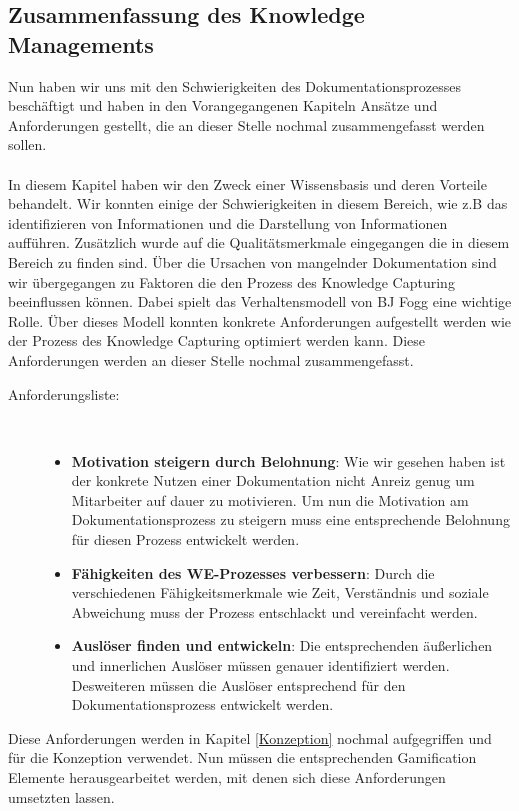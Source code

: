 \documentclass[a4paper,12pt]{scrartcl}
\begin{document}
\subsection{Zusammenfassung des Knowledge Managements}
\label{Zusammenfassung des Knowledge Managements}
Nun haben wir uns mit den Schwierigkeiten des Dokumentationsprozesses beschäftigt und haben in den Vorangegangenen Kapiteln Ansätze und Anforderungen gestellt, die an dieser Stelle nochmal zusammengefasst werden sollen.
\\\\
In diesem Kapitel haben wir den Zweck einer Wissensbasis und deren Vorteile behandelt. Wir konnten einige der Schwierigkeiten in diesem Bereich, wie z.B das identifizieren von Informationen und die Darstellung von Informationen aufführen. Zusätzlich wurde auf die Qualitätsmerkmale eingegangen die in diesem Bereich zu finden sind. Über die Ursachen von mangelnder Dokumentation sind wir übergegangen zu Faktoren die den Prozess des Knowledge Capturing beeinflussen können. Dabei spielt das Verhaltensmodell von BJ Fogg eine wichtige Rolle. Über dieses Modell konnten konkrete Anforderungen aufgestellt werden wie der Prozess des Knowledge Capturing optimiert werden kann. Diese Anforderungen werden an dieser Stelle nochmal zusammengefasst.
\begin{description}
   \item[Anforderungsliste:]~\par
   \begin{itemize}
      \item \textbf{Motivation steigern durch Belohnung}: Wie wir gesehen haben ist der konkrete Nutzen einer Dokumentation nicht Anreiz genug um Mitarbeiter auf dauer zu motivieren. Um nun die Motivation am Dokumentationsprozess zu steigern muss eine entsprechende Belohnung für diesen Prozess entwickelt werden.
      \item \textbf{Fähigkeiten des WE-Prozesses verbessern}: Durch die verschiedenen Fähigkeitsmerkmale wie Zeit, Verständnis und soziale Abweichung muss der Prozess entschlackt und vereinfacht werden.
      \item \textbf{Auslöser finden und entwickeln}: Die entsprechenden äußerlichen und innerlichen Auslöser müssen genauer identifiziert werden. Desweiteren müssen die Auslöser entsprechend für den Dokumentationsprozess entwickelt werden.
   \end{itemize}
\end{description}
Diese Anforderungen werden in Kapitel \ref{Konzeption} nochmal aufgegriffen und für die Konzeption verwendet. Nun müssen die entsprechenden Gamification Elemente herausgearbeitet werden, mit denen sich diese Anforderungen umsetzten lassen.    
\end{document}
